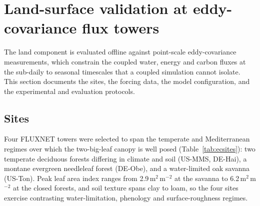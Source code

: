 %
%
%

\section{Land-surface validation at eddy-covariance flux towers}
\label{si:ecsite}

The land component is evaluated offline against point-scale eddy-covariance
measurements, which constrain the coupled water, energy and carbon fluxes at the
sub-daily to seasonal timescales that a coupled simulation cannot isolate. This
section documents the sites, the forcing data, the model configuration, and the
experimental and evaluation protocols.

\subsection{Sites}

Four FLUXNET towers were selected to span the temperate and Mediterranean
regimes over which the two-big-leaf canopy is well posed
(Table~\ref{tab:ecsites}): two temperate deciduous forests differing in climate
and soil (US-MMS, DE-Hai), a montane evergreen needleleaf forest (DE-Obe), and a
water-limited oak savanna (US-Ton). Peak leaf area index ranges from
2.9\,m$^2$\,m$^{-2}$ at the savanna to 6.2\,m$^2$\,m$^{-2}$ at the closed
forests, and soil texture spans clay to loam, so the four sites exercise
contrasting water-limitation, phenology and surface-roughness regimes.

